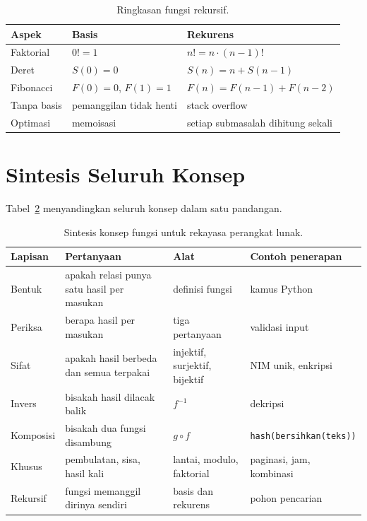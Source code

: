 \documentclass[11pt,a4paper]{article}
\begin{document}
\begin{table}[H]
	\centering
	\caption{Ringkasan fungsi rekursif.}
	\label{tab:rekursi}
	\small
	\begin{tabularx}{\textwidth}{l X X}
		\toprule
		Aspek       & Basis                   & Rekurens                          \\
		\midrule
		Faktorial   & $0!=1$                  & $n!=n \cdot (n-1)!$               \\
		Deret       & $S(0)=0$                & $S(n)=n+S(n-1)$                   \\
		Fibonacci   & $F(0)=0$, $F(1)=1$      & $F(n)=F(n-1)+F(n-2)$              \\
		Tanpa basis & pemanggilan tidak henti & stack overflow                    \\
		Optimasi    & memoisasi               & setiap submasalah dihitung sekali \\
		\bottomrule
	\end{tabularx}
\end{table}

\section{Sintesis Seluruh Konsep}

Tabel~\ref{tab:sintesis} menyandingkan seluruh konsep dalam satu pandangan.

\begin{table}[H]
	\centering
	\caption{Sintesis konsep fungsi untuk rekayasa perangkat lunak.}
	\label{tab:sintesis}
	\footnotesize
	\begin{tabularx}{\textwidth}{l X X X}
		\toprule
		Lapisan   & Pertanyaan                                 & Alat                          & Contoh penerapan               \\
		\midrule
		Bentuk    & apakah relasi punya satu hasil per masukan & definisi fungsi               & kamus Python                   \\
		Periksa   & berapa hasil per masukan                   & tiga pertanyaan               & validasi input                 \\
		Sifat     & apakah hasil berbeda dan semua terpakai    & injektif, surjektif, bijektif & NIM unik, enkripsi             \\
		Invers    & bisakah hasil dilacak balik                & $f^{-1}$                      & dekripsi                       \\
		Komposisi & bisakah dua fungsi disambung               & $g \circ f$                   & \texttt{hash(bersihkan(teks))} \\
		Khusus    & pembulatan, sisa, hasil kali               & lantai, modulo, faktorial     & paginasi, jam, kombinasi       \\
		Rekursif  & fungsi memanggil dirinya sendiri           & basis dan rekurens            & pohon pencarian                \\
		\bottomrule
	\end{tabularx}
\end{table}
\end{document}
